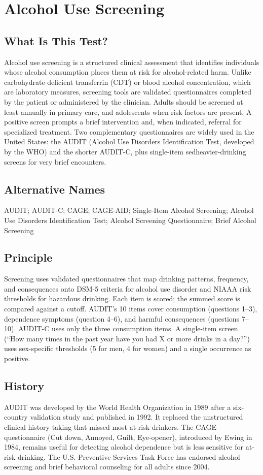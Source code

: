 \chapter{Alcohol Use Screening}

\section*{What Is This Test?}
Alcohol use screening is a structured clinical assessment that identifies individuals whose alcohol consumption places them at risk for alcohol-related harm. Unlike carbohydrate-deficient transferrin (CDT) or blood alcohol concentration, which are laboratory measures, screening tools are validated questionnaires completed by the patient or administered by the clinician. Adults should be screened at least annually in primary care, and adolescents when risk factors are present. A positive screen prompts a brief intervention and, when indicated, referral for specialized treatment. Two complementary questionnaires are widely used in the United States: the AUDIT (Alcohol Use Disorders Identification Test, developed by the WHO) and the shorter AUDIT-C, plus single-item sedheavier-drinking screens for very brief encounters.

\section*{Alternative Names}
AUDIT; AUDIT-C; CAGE; CAGE-AID; Single-Item Alcohol Screening; Alcohol Use Disorders Identification Test; Alcohol Screening Questionnaire; Brief Alcohol Screening

\section*{Principle}
Screening uses validated questionnaires that map drinking patterns, frequency, and consequences onto DSM-5 criteria for alcohol use disorder and NIAAA risk thresholds for hazardous drinking. Each item is scored; the summed score is compared against a cutoff. AUDIT's 10 items cover consumption (questions 1--3), dependence symptoms (question 4--6), and harmful consequences (questions 7--10). AUDIT-C uses only the three consumption items. A single-item screen (``How many times in the past year have you had X or more drinks in a day?'') uses sex-specific thresholds (5 for men, 4 for women) and a single occurrence as positive.

\section*{History}
AUDIT was developed by the World Health Organization in 1989 after a six-country validation study and published in 1992. It replaced the unstructured clinical history taking that missed most at-risk drinkers. The CAGE questionnaire (Cut down, Annoyed, Guilt, Eye-opener), introduced by Ewing in 1984, remains useful for detecting alcohol dependence but is less sensitive for at-risk drinking. The U.S. Preventive Services Task Force has endorsed alcohol screening and brief behavioral counseling for all adults since 2004.

